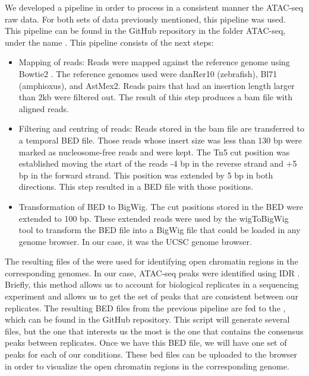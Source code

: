 We developed a pipeline in order to process in a consistent manner the ATAC-seq raw data. For both sets of data previously mentioned, this pipeline was used. This pipeline can be found in the GitHub repository in the folder ATAC-seq, under the name . This pipeline consists of the next steps:
\begin{itemize}
    \item Mapping of reads: Reads were mapped against the reference genome using Bowtie2 \parencite{langmead_fast_2012}. The reference genomes used were danRer10 (zebrafish), Bl71 (amphioxus), and AstMex2. Reads pairs that had an insertion length larger than 2kb were filtered out. The result of this step produces a bam file with aligned reads.
    \item Filtering and centring of reads: Reads stored in the bam file are transferred to a temporal BED file. Those reads whose insert size was less than 130 bp were marked as nucleosome-free reads and were kept. The Tn5 cut position was established moving the start of the reads -4 bp in the reverse strand and +5 bp in the forward strand. This position was extended by 5 bp in both directions. This step resulted in a BED file with those positions.
    \item Transformation of BED to BigWig. The cut positions stored in the BED were extended to 100 bp. These extended reads were used by the wigToBigWig tool to transform the BED file into a BigWig file that could be loaded in any genome browser. In our case, it was the UCSC genome browser. 

\end{itemize}

The resulting files of the  were used for identifying open chromatin regions in the corresponding genomes. In our case, ATAC-seq peaks were identified using IDR \parencite{li_measuring_2011}. Briefly, this method allows us to account for biological replicates in a sequencing experiment and allows us to get the set of peaks that are consistent between our replicates. The resulting BED files from the previous pipeline are fed to the , which can be found in the GitHub repository. This script will generate several files, but the one that interests us the most is the one that contains the consensus peaks between replicates. Once we have this BED file, we will have one set of peaks for each of our conditions. These bed files can be uploaded to the browser in order to visualize the open chromatin regions in the corresponding genome.

